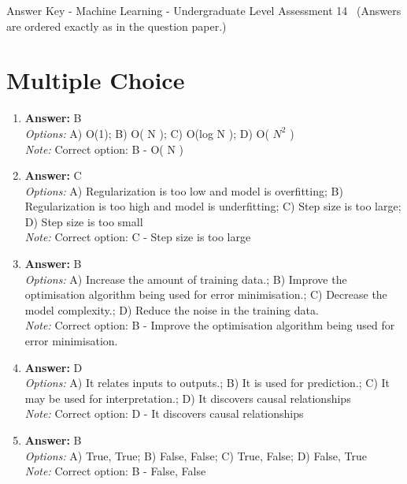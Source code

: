\documentclass[12pt]{article}
\begin{document}
\begin{center}
Answer Key - Machine Learning - Undergraduate Level Assessment 14 \
\small (Answers are ordered exactly as in the question paper.)
\end{center}

\section*{Multiple Choice}
\begin{enumerate}[label=\arabic*.]
\item \textbf{Answer:} B
\\ \textit{Options:} A) O(1); B) O( N ); C) O(log N ); D) O( $N^2$ )
\\ \textit{Note:} Correct option: B - O( N )
\item \textbf{Answer:} C
\\ \textit{Options:} A) Regularization is too low and model is overfitting; B) Regularization is too high and model is underfitting; C) Step size is too large; D) Step size is too small
\\ \textit{Note:} Correct option: C - Step size is too large
\item \textbf{Answer:} B
\\ \textit{Options:} A) Increase the amount of training data.; B) Improve the optimisation algorithm being used for error minimisation.; C) Decrease the model complexity.; D) Reduce the noise in the training data.
\\ \textit{Note:} Correct option: B - Improve the optimisation algorithm being used for error minimisation.
\item \textbf{Answer:} D
\\ \textit{Options:} A) It relates inputs to outputs.; B) It is used for prediction.; C) It may be used for interpretation.; D) It discovers causal relationships
\\ \textit{Note:} Correct option: D - It discovers causal relationships
\item \textbf{Answer:} B
\\ \textit{Options:} A) True, True; B) False, False; C) True, False; D) False, True
\\ \textit{Note:} Correct option: B - False, False
\end{enumerate}
\end{document}

